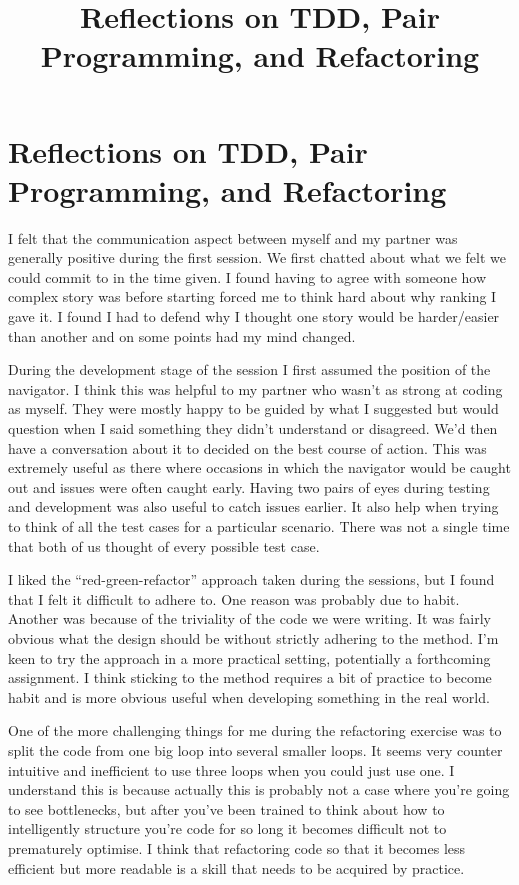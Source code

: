 \documentclass[paper=a4, fontsize=11pt]{scrartcl}	%
\title{
	\vspace{-0.5in} 	\usefont{OT1}{bch}{b}{n}
	 Reflections on TDD, Pair Programming, and Refactoring
}
\author{}
\date{}
\numberwithin{equation}{section}															%
\numberwithin{figure}{section}																%
\numberwithin{table}{section}
\begin{document}
\section*{Reflections on TDD, Pair Programming, and Refactoring}
I felt that the communication aspect between myself and my partner was generally positive during the first session. We first chatted about what we felt we could commit to in the time given. I found having to agree with someone how complex story was before starting forced me to think hard about why ranking I gave it. I found I had to defend why I thought one story would be harder/easier than another and on some points had my mind changed.

During the development stage of the session I first assumed the position of the navigator. I think this was helpful to my partner who wasn't as strong at coding as myself. They were mostly happy to be guided by what I suggested but would question when I said something they didn't understand or disagreed. We'd then have a conversation about it to decided on the best course of action. This was extremely useful as there where occasions in which the navigator would be caught out and issues were often caught early. Having two pairs of eyes during testing and development was also useful to catch issues earlier. It also help when trying to think of all the test cases for a particular scenario. There was not a single time that both of us thought of every possible test case.

I liked the ``red-green-refactor'' approach taken during the sessions, but I found that I felt it difficult to adhere to. One reason was probably due to habit. Another was because of the triviality of the code we were writing. It was fairly obvious what the design should be without strictly adhering to the method. I'm keen to try the approach in a more practical setting, potentially a forthcoming assignment. I think sticking to the method requires a bit of practice to become habit and is more obvious useful when developing something in the real world.

One of the more challenging things for me during the refactoring exercise was to split the code from one big loop into several smaller loops. It seems very counter intuitive and inefficient to use three loops when you could just use one. I understand this is because actually this is probably not a case where you're going to see bottlenecks, but after you've been trained to think about how to intelligently structure you're code for so long it becomes difficult not to prematurely optimise. I think that refactoring code so that it becomes less efficient but more readable is a skill that needs to be acquired by practice.
\end{document}
